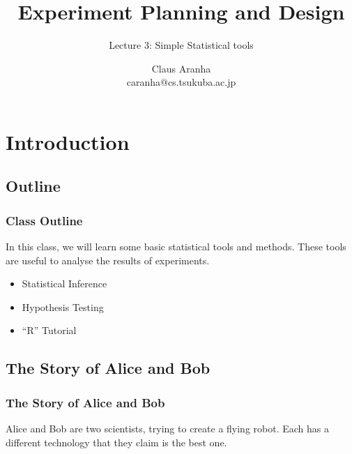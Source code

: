 \documentclass[10pt]{beamer}
\title[]{Experiment Planning and Design}
\subtitle[]{Lecture 3: Simple Statistical tools}
\author[Claus Aranha]{Claus Aranha\\{\footnotesize caranha@cs.tsukuba.ac.jp}}
\institute{Department of Computer Science}
\begin{document}
\section{Introduction}
\subsection{Outline}

\begin{frame}
  \maketitle
\end{frame}

\begin{frame}
  \frametitle{Class Outline}
  \begin{block}{}
    In this class, we will learn some basic statistical tools and
    methods. These tools are useful to analyse the results of
    experiments.
  \end{block}
  \begin{itemize}
  \item Statistical Inference
  \item Hypothesis Testing
  \item ``R'' Tutorial
  \end{itemize}
\end{frame}

\subsection{The Story of Alice and Bob}

\begin{frame}
  \frametitle{The Story of Alice and Bob}
  \begin{block}{}
    Alice and Bob are two scientists, trying to create a flying
    robot. Each has a different technology that they claim is the best
    one.
  \end{block}
\end{frame}
\end{document}
